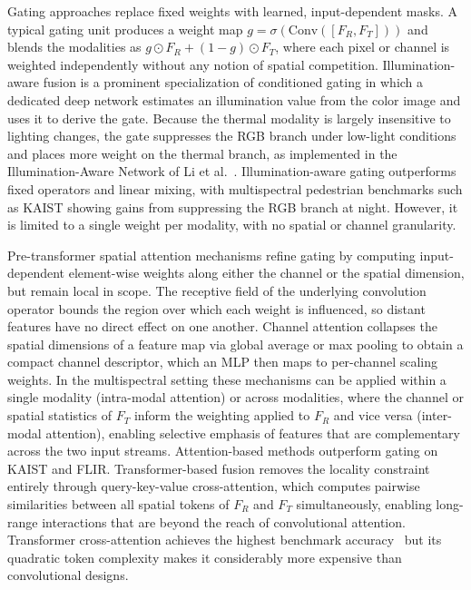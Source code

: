 \documentclass[12pt,oneside,bibtotoc,liststotoc]{scrbook}
\begin{document}
Gating approaches replace fixed weights with learned, input-dependent masks.
A typical gating unit produces a weight map $g = \sigma\!\left(\mathrm{Conv}([F_R, F_T])\right)$
and blends the modalities as $g \odot F_R + (1 - g) \odot F_T$, where each pixel or channel is
weighted independently without any notion of spatial competition.\cite{zheng2019GFD_SSD, kim2018DeepGatedFusionNetwork}
Illumination-aware fusion is a prominent specialization of conditioned gating in which a dedicated deep network
estimates an illumination value from the color image and uses it to derive the gate.
Because the thermal modality is largely insensitive to lighting changes, the gate suppresses the
RGB branch under low-light conditions and places more weight on the thermal branch, as implemented
in the Illumination-Aware Network of Li et al.\ \cite{li2019illuminationAwareFasterRCNN}.
Illumination-aware gating outperforms fixed operators and linear mixing, with multispectral pedestrian
benchmarks such as KAIST showing gains from suppressing the RGB branch at night.
However, it is limited to a single weight per modality, with no spatial or channel granularity.

Pre-transformer spatial attention mechanisms refine gating by computing input-dependent element-wise weights
along either the channel or the spatial dimension, but remain local in scope.
The receptive field of the underlying convolution operator bounds the region over which each weight is
influenced, so distant features have no direct effect on one another.
Channel attention collapses the spatial dimensions of a feature map via global average or max
pooling to obtain a compact channel descriptor, which an MLP then maps to per-channel
scaling weights.
In the multispectral setting these mechanisms can be applied within a single modality
(intra-modal attention) or across modalities, where the channel or spatial statistics of
$F_T$ inform the weighting applied to $F_R$ and vice versa (inter-modal attention),
enabling selective emphasis of features that are complementary across the two input streams.
Attention-based methods outperform gating on KAIST and FLIR.
\cite{wang2020ECANet, zhang2019crossModalityInteractiveAttentionNetwork, zhang2021GAFF, liang2023explicitAttentionEnhancedFusion}
Transformer-based fusion \cite{qingyun2021CFT} removes the locality constraint entirely through
query-key-value cross-attention, which computes pairwise similarities between all spatial tokens
of $F_R$ and $F_T$ simultaneously, enabling long-range interactions that are beyond the reach of
convolutional attention.
Transformer cross-attention achieves the highest benchmark accuracy~\cite{qingyun2021CFT} but
its quadratic token complexity makes it considerably more expensive than convolutional designs.
\end{document}
